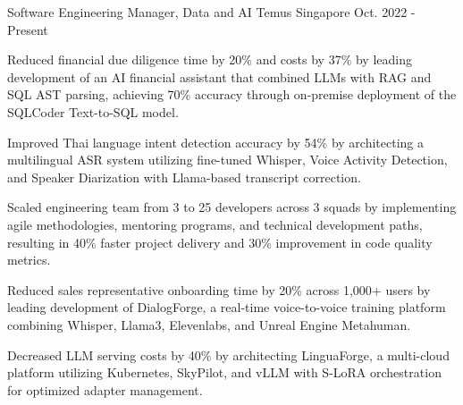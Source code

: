

\begin{cventries}

  \cventry
    {Software Engineering Manager, Data and AI} %
    {Temus} %
    {Singapore} %
    {Oct. 2022 - Present} %
    {
      \begin{cvitems} %
        \item {Reduced financial due diligence time by 20\% and costs by 37\% by leading development of an AI financial assistant that combined LLMs with RAG and SQL AST parsing, achieving 70\% accuracy through on-premise deployment of the SQLCoder Text-to-SQL model.}
        \item{Improved Thai language intent detection accuracy by 54\% by architecting a multilingual ASR system utilizing fine-tuned Whisper, Voice Activity Detection, and Speaker Diarization with Llama-based transcript correction.}
        \item {Scaled engineering team from 3 to 25 developers across 3 squads by implementing agile methodologies, mentoring programs, and technical development paths, resulting in 40\% faster project delivery and 30\% improvement in code quality metrics.}
        \item{Reduced sales representative onboarding time by 20\% across 1,000+ users by leading development of DialogForge, a real-time voice-to-voice training platform combining Whisper, Llama3, Elevenlabs, and Unreal Engine Metahuman.}
        \item{Decreased LLM serving costs by 40\% by architecting LinguaForge, a multi-cloud platform utilizing Kubernetes, SkyPilot, and vLLM with S-LoRA orchestration for optimized adapter management.}
      \end{cvitems}
    }


\end{cventries}
